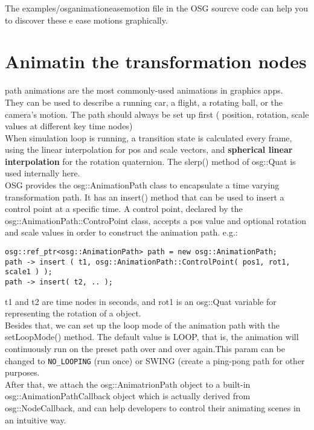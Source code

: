 \documentclass[a4paper,12pt]{book}
\begin{document}
The examples/osganimationeasemotion file in the OSG sourcve code can help you to discover these e ease motions graphically.

\section{Animatin the transformation nodes}
path animations are the most commonly-used animations in graphics apps.\\
They can be used to describe a running car, a flight, a rotating ball, or the camera's motion. The path should always be set up first ( position, rotation, scale values at different key time nodes)\\
When simulation loop is running, a transition state is calculated every frame, using the linear interpolation for pos and scale vectors, and \textbf{spherical linear interpolation} for the rotation quaternion. The slerp() method of osg::Quat is used internally here.\\

OSG provides the osg::AnimationPath class to encapsulate a time varying transformation path. It has an insert() method that can be used to insert a control point at a specific time. A control point, declared by the osg::AnimationPath::ControPoint class, accepts a pos value and optional rotation and scale values in order to construct the animation path. e.g.:
\begin{lstlisting}
osg::ref_ptr<osg::AnimationPath> path = new osg::AnimationPath;
path -> insert ( t1, osg::AnimationPath::ControlPoint( pos1, rot1, scale1 ) );
path -> insert( t2, .. );
\end{lstlisting}

t1 and t2 are time nodes in seconds, and rot1 is an osg::Quat variable for representing the rotation of a object.\\

Besides that, we can set up the loop mode of the animation path with the setLoopMode() method. The default value is LOOP, that is, the animation will continuously run on the preset path over and over again.This param can be changed to \verb|NO_LOOPING| (run once) or SWING (create a ping-pong path for other purposes.\\

After that, we attach the osg::AnimatrionPath object to a built-in osg::AnimationPathCallback object which is actually derived from osg::NodeCallback, and can help developers to control their animating scenes in an intuitive way.\\
\end{document}
